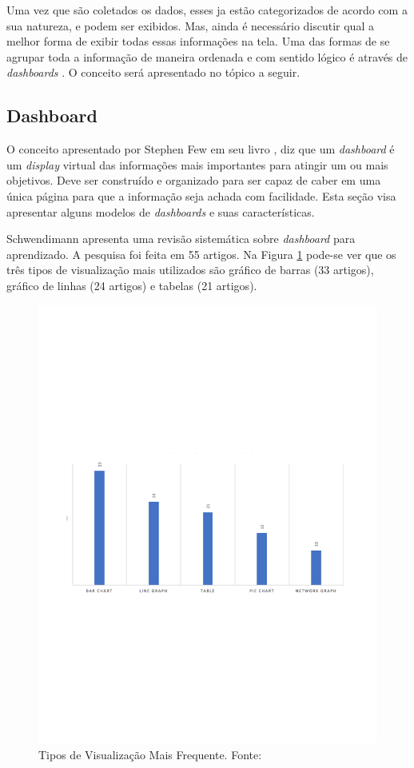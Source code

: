 Uma vez que são coletados os dados, esses ja estão categorizados de acordo com a sua natureza, e podem ser exibidos. Mas, ainda é necessário discutir qual a melhor forma de exibir  todas essas informações na tela. Uma das formas de se agrupar toda a informação de maneira ordenada e com sentido lógico é através de \textit{dashboards} \cite{book_design}. O conceito será apresentado no tópico a seguir.


\subsection{Dashboard}
O conceito apresentado por Stephen Few em seu livro \cite{book_design}, diz que um \textit{dashboard} é um \textit{display} virtual das informações mais importantes para atingir um ou mais objetivos. Deve ser construído e organizado para ser capaz de caber em uma única página para que a informação seja achada com facilidade. Esta seção visa apresentar alguns modelos de \textit{dashboards} e suas características.

Schwendimann \cite{schwendimann_perceiving_2016} apresenta uma revisão sistemática sobre \textit{dashboard} para aprendizado. A pesquisa foi feita em 55 artigos. Na Figura \ref{img:tipo_visualizacao} pode-se ver que os três tipos de visualização mais utilizados são gráfico de barras (33 artigos), gráfico de linhas (24 artigos) e tabelas (21 artigos).
\graphicspath{{figuras/}}
\begin{figure}[h!]
\centering
\includegraphics[scale=0.60]{grafico_pesquisa}
\caption{Tipos de Visualização Mais Frequente. Fonte: \cite{schwendimann_perceiving_2016}}
\label{img:tipo_visualizacao}
\end{figure}

